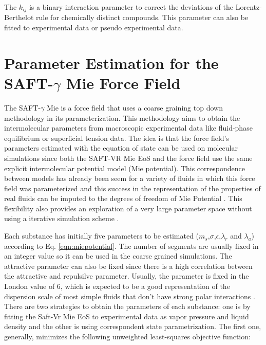 The $k_{ij}$ is a binary interaction parameter to correct the deviations of the Lorentz-Berthelot rule for chemically distinct compounds. This parameter can also be fitted to experimental data or pseudo experimental data.


\section{Parameter Estimation for the SAFT-$\gamma$ Mie Force Field}

The SAFT-$\gamma$ Mie is a force field that uses a  coarse graining top down methodology in its parameterization. This methodology aims to obtain the intermolecular parameters from macroscopic experimental data like fluid-phase equilibrium or superficial tension data. The idea is that the force field's  parameters estimated with the equation of state can be used on molecular simulations since both the SAFT-VR Mie EoS and the force field use the same explicit intermolecular potential model (Mie potential). This correspondence between models has already been seem for a variety of fluids in which this force field was parameterized and  this success in the representation of the properties of real fluids can be imputed to the degrees of freedom of Mie Potential \cite{herdes2015}. This flexibility also provides an exploration of a very large parameter space without using a iterative simulation scheme \cite{avendano2011}. 

Each substance has initially five parameters to be estimated ($m_s$,$\sigma$,$\epsilon$,$\lambda_{r}$ and $\lambda_{a}$) according to Eq. \eqref{eqn:miepotential}. The number of segments are usually fixed in an integer value so it can be used in the coarse grained simulations. The attractive parameter can also be fixed since there is a high correlation between the attractive and repulsilve parameter. Usually, the parameter is fixed in the London value of 6, which is expected to be a good representation of the dispersion scale of most simple fluids that don't have strong polar interactions \cite{ramrattan2015,herdes2015}. There are two strategies to obtain the parameters of each substance: one is by fitting the Saft-Vr Mie EoS to experimental data as vapor pressure and liquid density and the other is using correspondent state parametrization. The first one, generally, minimizes the following unweighted least-squares objective function:

